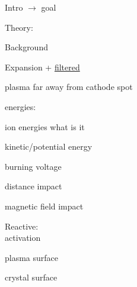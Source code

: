 \large
\begin{compactitem}
	\item Intro $\rightarrow$ goal
	\item Theory: 
		\begin{compactitem}
			\item Background
			\item Expansion + \underline{filtered}
			\item plasma far away from cathode spot
			\item energies:
			\begin{compactitem}
				\item ion energies what is it
				\item kinetic/potential energy
				\item burning voltage
				\item distance impact
				\item magnetic field impact
			\end{compactitem}
			\item Reactive:\\
				activation
			\end{compactitem}
			\item plasma surface
			\item crystal surface
\end{compactitem}
\normalsize